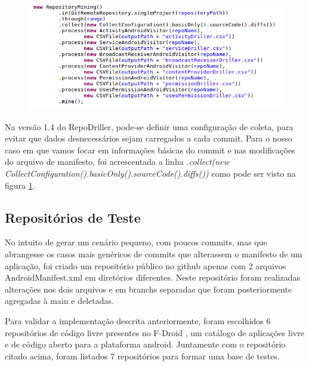\documentclass[a4paper,12pt]{article}
\numberwithin{figure}{section}
\begin{document}
\begin{figure}[h]
\centering
\includegraphics[width=\linewidth]{imgs/repostudy.png}
\label{fig:repostudy}
\end{figure}

Na versão 1.4 do RepoDriller, pode-se definir uma configuração de coleta, para evitar que dados desnecessários sejam carregados a cada commit. Para o nosso caso em que vamos focar em informações básicas do commit e nas modificações do arquivo de manifesto, foi acrescentada a linha \textit{.collect(new CollectConfiguration().basicOnly().sourceCode().diffs())} como pode ser visto na figura \ref{fig:repostudy}.





\subsection{Repositórios de Teste}%

No intuito de gerar um cenário pequeno, com poucos commits, mas que abrangesse os casos mais genéricos de commits que alterassem o manifesto de um aplicação, foi criado um repositório público no github apenas com 2 arquivos AndroidManifest.xml em diretórios diferentes. Neste repositório foram realizadas alterações nos dois arquivos e em branchs separadas que foram posteriormente agregadas à main e deletadas.

Para validar a implementação descrita anteriormente, foram escolhidos 6 repositórios de código livre presentes no F-Droid \cite{fdroid}, um catálogo de aplicações livre e de código aberto para a plataforma android. Juntamente com o repositório citado acima, foram listados 7 repositórios para formar uma base de testes.

\end{document}

